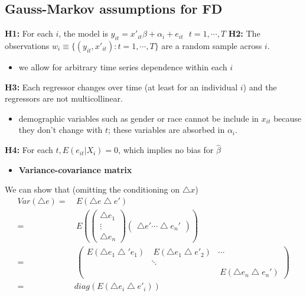 \documentclass[a4paper,twoside,11pt]{article}
\begin{document}
\subsection{Gauss-Markov assumptions for FD}
\textbf{H1:} For each $i$, the model is $y_{it} = x'_{it} \beta + \alpha_i + e_{it} \ \ \ t = 1,\cdots , T$ 
\newline
\textbf{H2:} The observations $w_i \equiv \{ (y_{it}, x'_{it} ) : t=1, \cdots,  T\}$ are a random sample across $i$.
\begin{itemize}
    \item we allow for arbitrary time series dependence within each $i$
\end{itemize}
\textbf{H3:} Each regressor changes over time (at least for an individual $i$) and the regressors are not multicollinear.
\begin{itemize}
    \item demographic variables such as gender or race cannot be include in $x_{it}$ because they don't change with $t$; these variables are absorbed in $\alpha_i$.
\end{itemize}
\textbf{H4:} For each $t, E(e_{it}|X_i) =0$, which implies no bias for $\hat{\beta}$
\begin{itemize}
    \item \textbf{Variance-covariance matrix}
\end{itemize}
We can show that (omitting the conditioning on $\bigtriangleup x$)
\begin{equation*}
\begin{aligned}
Var(\bigtriangleup e) =& \ E(\bigtriangleup e \bigtriangleup e') \\
=& \ E( \begin{pmatrix}
\bigtriangleup e_1 \\
\vdots \\
\bigtriangleup e_n
\end{pmatrix} \begin{pmatrix}
\bigtriangleup e' \cdots \bigtriangleup e_n'
\end{pmatrix}) \\ 
=& \ \begin{pmatrix}
E(\bigtriangleup e_1 \bigtriangleup' e_1) & \ E(\bigtriangleup e_1 \bigtriangleup e'_2) & \cdots \\
\ & \ddots & \ \\
\ & \ & \ E(\bigtriangleup e_n \bigtriangleup e_n')
\end{pmatrix} \\
=& diag (E(\bigtriangleup e_i \bigtriangleup e'_i))
\end{aligned}
\end{equation*}
\end{document}
